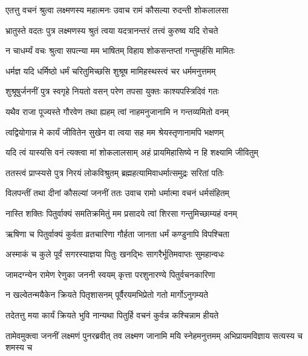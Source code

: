\twolineshloka
{एतत्तु वचनं श्रुत्वा लक्ष्मणस्य महात्मनः}
{उवाच रामं कौसल्या रुदन्ती शोकलालसा} %

\twolineshloka
{भ्रातुस्ते वदतः पुत्र लक्ष्मणस्य श्रुतं त्वया}
{यदत्रानन्तरं तत्त्वं कुरुष्व यदि रोचते} %

\twolineshloka
{न चाधर्म्यं वचः श्रुत्वा सपत्न्या मम भाषितम्}
{विहाय शोकसन्तप्तां गन्तुमर्हसि मामितः} %

\twolineshloka
{धर्मज्ञ यदि धर्मिष्ठो धर्मं चरितुमिच्छसि}
{शुश्रूष मामिहस्थस्त्वं चर धर्ममनुत्तमम्} %

\twolineshloka
{शुश्रूषुर्जननीं पुत्र स्वगृहे नियतो वसन्}
{परेण तपसा युक्तः काश्यपस्त्रिदिवं गतः} %

\twolineshloka
{यथैव राजा पूज्यस्ते गौरवेण तथा ह्यहम्}
{त्वां नाहमनुजानामि न गन्तव्यमितो वनम्} %

\twolineshloka
{त्वद्वियोगान्न मे कार्यं जीवितेन सुखेन वा}
{त्वया सह मम श्रेयस्तृणानामपि भक्षणम्} %

\twolineshloka
{यदि त्वं यास्यसि वनं त्यक्त्वा मां शोकलालसाम्}
{अहं प्रायमिहासिष्ये न हि शक्ष्यामि जीवितुम्} %

\twolineshloka
{ततस्त्वं प्राप्स्यसे पुत्र निरयं लोकविश्रुतम्}
{ब्रह्महत्यामिवाधर्मात्समुद्रः सरितां पतिः} %

\twolineshloka
{विलपन्तीं तथा दीनां कौसल्यां जननीं ततः}
{उवाच रामो धर्मात्मा वचनं धर्मसंहितम्} %

\twolineshloka
{नास्ति शक्तिः पितुर्वाक्यं समतिक्रमितुं मम}
{प्रसादये त्वां शिरसा गन्तुमिच्छाम्यहं वनम्} %

\twolineshloka
{ऋषिणा च पितुर्वाक्यं कुर्वता व्रतचारिणा}
{गौर्हता जानता धर्मं कण्डुनापि विपश्चिता} %

\twolineshloka
{अस्माकं च कुले पूर्वं सगरस्याज्ञया पितुः}
{खनद्भिः सागरैर्भूतिमवाप्तः सुमहान्वधः} %

\twolineshloka
{जामदग्न्येन रामेण रेणुका जननी स्वयम्}
{कृत्ता परशुनारण्ये पितुर्वचनकारिणा} %

\twolineshloka
{न खल्वेतन्मयैकेन क्रियते पितृशासनम्}
{पूर्वैरयमभिप्रेतो गतो मार्गोऽनुगम्यते} %

\twolineshloka
{तदेतत्तु मया कार्यं क्रियते भुवि नान्यथा}
{पितुर्हि वचनं कुर्वन्न कश्चिन्नाम हीयते} %

\threelineshloka
{तामेवमुक्त्वा जननीं लक्ष्मणं पुनरब्रवीत्}
{तव लक्ष्मण जानामि मयि स्नेहमनुत्तमम्}
{अभिप्रायमविज्ञाय सत्यस्य च शमस्य च} %

